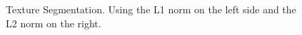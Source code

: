 \begin{figure}
	\centering
	\begin{minipage}[t]{0.49\linewidth}
		\centering
	\end{minipage}
	\hfill
	\begin{minipage}[t]{0.49\linewidth}
		\centering
	\end{minipage}
	\caption{Texture Segmentation. Using the L1 norm on the left side and the L2 norm on the right.}
	\label{fig:DistanceNorm}
\end{figure}


